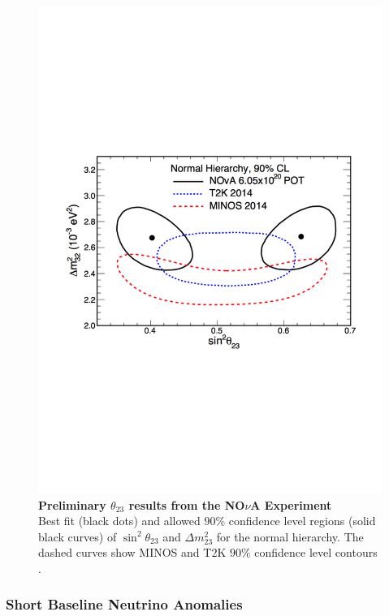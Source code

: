 \begin{figure}
	\begin{center}
		\includegraphics[scale=0.7]{Figures/nova_result.pdf}
		\caption[Preliminary $\theta_{23}$ results from the NO$\nu$A Experiment]{ {\textbf{Preliminary $\theta_{23}$ results from the NO$\nu$A Experiment}} \\ Best fit (black dots) and allowed $90\%$ confidence level regions (solid black curves) of $\sin^2 \theta_{23}$ and $\Delta m^2_{23}$ for the normal hierarchy. The dashed curves show MINOS \cite{MINOS} and T2K \cite{T2K} $90\%$ confidence level contours \cite{NOVA}.}
		\label{nova_result}	
	\end{center}
\end{figure} 

\subsubsection{Short Baseline Neutrino Anomalies}

